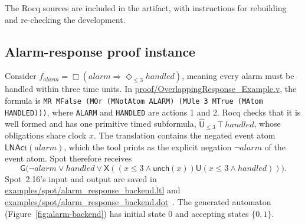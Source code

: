 \documentclass[manuscript]{acmart}
\newcommand{\Until}{\mathbin{\mathsf{U}}}
\newcommand{\Next}{\mathsf{X}}
\newcommand{\Unch}{\mathsf{unch}}
\newcommand{\Rocqid}[1]{\url{#1}}
\begin{document}
The Rocq sources are included in the artifact, with instructions for
rebuilding and re-checking the development.

\subsection{Alarm-response proof instance}
\label{sec:alarm-example}
Consider $f_{\mathit{alarm}}=\Box(\mathit{alarm}\Rightarrow
\Diamond_{\le 3}\mathit{handled})$, meaning every alarm must be handled within
three time units. In
\Rocqid{proof/OverlappingResponse_Example.v}, the formula is
\texttt{MR MFalse (MOr (MNotAtom ALARM) (MUle 3 MTrue (MAtom HANDLED)))},
where \texttt{ALARM} and \texttt{HANDLED} are actions 1 and 2. Rocq checks
that it is well formed and has one primitive timed subformula,
$\widehat{\mathsf{U}}_{\le 3}\,\top\,\mathit{handled}$, whose obligations
share clock $x$. The translation contains the negated event atom
$\mathsf{LNAct}(\mathit{alarm})$, which the tool prints as the explicit
negation $\neg\mathit{alarm}$ of the event atom. Spot therefore
receives
\[
\mathsf{G}\bigl(\neg\mathit{alarm}\lor \mathit{handled}\lor \Next((x\le3\land\Unch(x))\Until(x\le3\land\mathit{handled}))\bigr).
\]
Spot~2.16's input and output are saved in
\Rocqid{examples/spot/alarm_response_backend.ltl} and
\Rocqid{examples/spot/alarm_response_backend.dot}~\cite{spot}. The generated
automaton (Figure~\ref{fig:alarm-backend}) has initial state 0 and accepting
states $\{0,1\}$.
\end{document}
